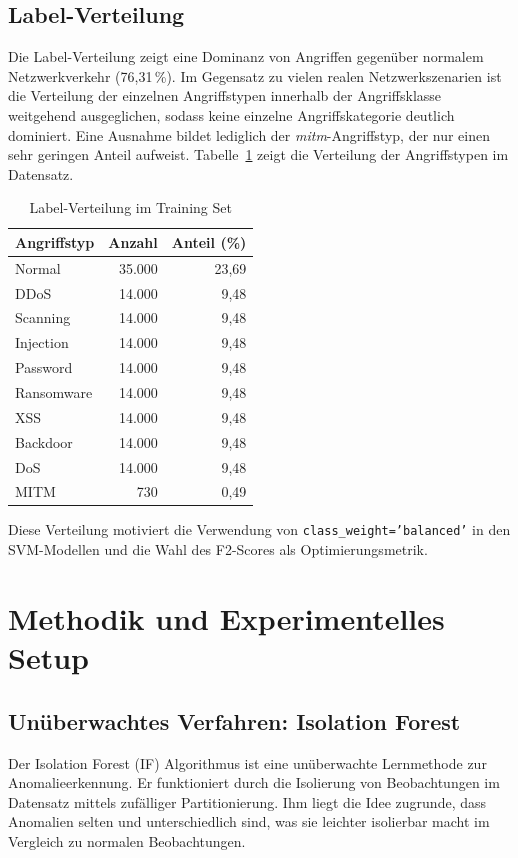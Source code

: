 \documentclass[12pt,oneside]{article}
\begin{document}
	\subsection{Label-Verteilung}
	Die Label-Verteilung zeigt eine Dominanz von Angriffen gegenüber normalem Netzwerkverkehr (76{,}31\,\%). Im Gegensatz zu vielen realen Netzwerkszenarien ist die Verteilung der einzelnen Angriffstypen innerhalb der Angriffsklasse weitgehend ausgeglichen, sodass keine einzelne Angriffskategorie deutlich dominiert. Eine Ausnahme bildet lediglich der \textit{mitm}-Angriffstyp, der nur einen sehr geringen Anteil aufweist. Tabelle~\ref{tab:label-dist} zeigt die Verteilung der Angriffstypen im Datensatz. 
	\FloatBarrier
	\begin{table}[h]
		\centering
		\caption{Label-Verteilung im Training Set}
		\label{tab:label-dist}
		\begin{tabular}{lrr}
			\toprule
			\textbf{Angriffstyp} & \textbf{Anzahl} & \textbf{Anteil (\%)} \\
			\midrule
			Normal   	& 35.000 & 23,69 \\
			DDoS     	& 14.000 & 9,48 \\
			Scanning 	& 14.000 & 9,48 \\
			Injection 	& 14.000 & 9,48 \\
			Password 	& 14.000 & 9,48 \\
			Ransomware	& 14.000 & 9,48  \\
			XSS      	& 14.000 & 9,48  \\
			Backdoor    & 14.000 & 9,48  \\
			DoS		    & 14.000 & 9,48  \\
			MITM	   	& 730  	 & 0,49  \\
			\bottomrule
		\end{tabular}
	\end{table}
	\FloatBarrier
	Diese Verteilung motiviert die Verwendung von \texttt{class\_weight='balanced'} in den SVM-Modellen und die Wahl des F2-Scores als Optimierungsmetrik.
	\section{Methodik und Experimentelles Setup}
	\label{sec:methodology}
	\subsection{Unüberwachtes Verfahren: Isolation Forest}
	Der Isolation Forest (IF) Algorithmus ist eine unüberwachte Lernmethode zur Anomalieerkennung. Er funktioniert durch die Isolierung von Beobachtungen im Datensatz mittels zufälliger Partitionierung. Ihm liegt die Idee zugrunde, dass Anomalien selten und unterschiedlich sind, was sie leichter isolierbar macht im Vergleich zu normalen Beobachtungen.
\end{document}
